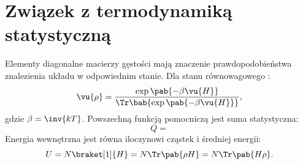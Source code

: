 
\section{Związek z termodynamiką statystyczną}
Elementy diagonalne macierzy gęstości mają znaczenie prawdopodobieństwa znalezienia układu w odpowiednim stanie. Dla stanu równowagowego \cite{myers}:
\begin{equation}\label{eq:macierz_gestosci_rownowaga}
	\vu{\rho} = \frac{\exp\pab{-\beta \vu{H}}}{\Tr\bab{\exp\pab{-\beta \vu{H}}}},
\end{equation}
gdzie \(\beta = \inv{kT}\).
Powszechną funkcją pomocniczą jest suma statystyczna:
\begin{equation}\label{eq:suma_statystyczna}
	Q = 
\end{equation}
Energia wewnętrzna jest równa iloczynowi cząstek i średniej energii:
\begin{equation*}
	U = N\braket[1]{H} = N\Tr\pab{\rho H} = N\Tr\pab{H \rho}.
\end{equation*}
